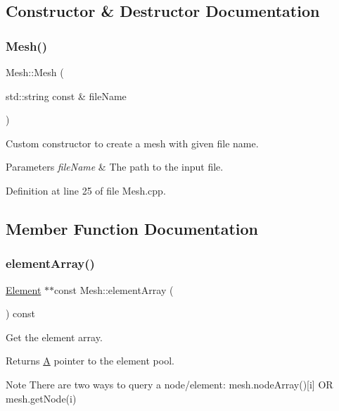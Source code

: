 \subsection{Constructor \& Destructor Documentation}
\mbox{\label{class_mesh_af9ff79e2003cfde74b16266cd8113acf}} 
\subsubsection{\texorpdfstring{Mesh()}{Mesh()}}
{\footnotesize\ttfamily Mesh\+::\+Mesh (\begin{DoxyParamCaption}\item[{std\+::string const \&}]{file\+Name }\end{DoxyParamCaption})}



Custom constructor to create a mesh with given file name. 


\begin{DoxyParams}{Parameters}
{\em file\+Name} & The path to the input file. \\
\hline
\end{DoxyParams}


Definition at line 25 of file Mesh.\+cpp.



\subsection{Member Function Documentation}
\mbox{\label{class_mesh_a042cc2ef19b7090f830b915721818181}} 
\subsubsection{\texorpdfstring{element\+Array()}{elementArray()}}
{\footnotesize\ttfamily \mbox{\hyperlink{class_element}{Element}} $\ast$$\ast$const Mesh\+::element\+Array (\begin{DoxyParamCaption}{ }\end{DoxyParamCaption}) const}



Get the element array. 

\begin{DoxyReturn}{Returns}
\mbox{\hyperlink{class_a}{A}} pointer to the element pool.
\end{DoxyReturn}
\begin{DoxyNote}{Note}
There are two ways to query a node/element\+: mesh.\+node\+Array()\mbox{[}i\mbox{]} OR mesh.\+get\+Node(i) 
\end{DoxyNote}


